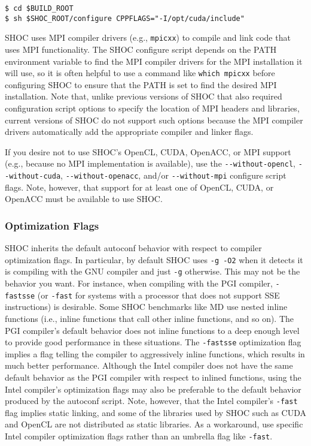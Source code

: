 \documentclass[11pt]{article}
\begin{document}
\begin{Verbatim}[frame=single]
$ cd $BUILD_ROOT
$ sh $SHOC_ROOT/configure CPPFLAGS="-I/opt/cuda/include"
\end{Verbatim}

SHOC uses MPI compiler drivers (e.g., \verb+mpicxx+) to compile and link code
that uses MPI functionality.
The SHOC configure script depends on the PATH environment variable to find
the MPI compiler drivers for the MPI installation it will use, so it is often
helpful to use a command like \verb+which mpicxx+ before configuring SHOC
to ensure that the PATH is set to find the desired MPI installation.
Note that, unlike previous versions of SHOC that also required configuration
script options to specify the location of MPI headers and libraries, current
versions of SHOC do not support such options because the MPI compiler drivers
automatically add the appropriate compiler and linker flags.

If you desire not to use SHOC's OpenCL, CUDA, OpenACC, or MPI support 
(e.g., because no MPI implementation is available), use the 
\verb+--without-opencl+,
\verb+--without-cuda+,
\verb+--without-openacc+,
and/or \verb+--without-mpi+ configure script flags.
Note, however, that support for at least one of OpenCL, CUDA, or OpenACC 
must be available to use SHOC.

\subsubsection{Optimization Flags}\label{sec:confoptflags}

SHOC inherits the default autoconf behavior with respect to compiler 
optimization flags.
In particular, by default SHOC uses \verb+-g -O2+ when it detects it is
compiling with the GNU compiler and just \verb+-g+ otherwise.
This may not be the behavior you want.
For instance, when compiling with the PGI compiler, \verb+-fastsse+ 
(or \verb+-fast+ for systems with a processor that does not support SSE
instructions) is desirable.
Some SHOC benchmarks like MD use nested inline functions (i.e., inline
functions that call other inline functions, and so on).
The PGI compiler's default behavior does not inline functions to a deep enough
level to provide good performance in these situations.
The \verb+-fastsse+ optimization flag implies a flag telling the compiler
to aggressively inline functions, which results in much better performance.
Although the Intel compiler does not have the same default behavior as
the PGI compiler with respect to inlined functions, using the Intel
compiler's optimization flags may also be preferable to the default behavior
produced by the autoconf script.
Note, however, that the Intel compiler's \verb+-fast+ flag implies static
linking, and some of the libraries used by SHOC such as CUDA and OpenCL 
are not distributed as static libraries.
As a workaround, use specific Intel compiler optimization flags rather than
an umbrella flag like \verb+-fast+.
\end{document}
